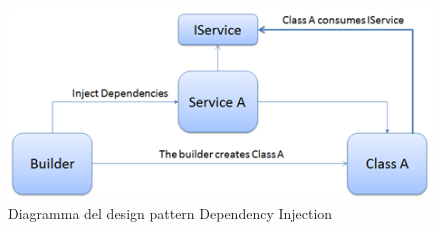 \begin{figure}[h]
\begin{center}
\includegraphics[scale=0.8]{img/dependency.png}
\caption{Diagramma del design pattern Dependency Injection}
\end{center}
\end{figure}

